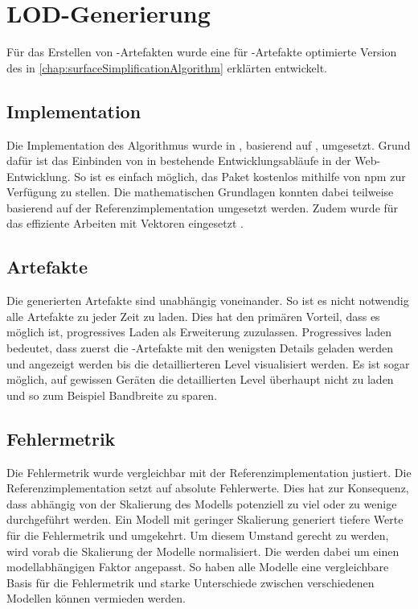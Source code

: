 \section{LOD-Generierung}

Für das Erstellen von -Artefakten wurde eine für -Artefakte optimierte Version des in \autoref{chap:surfaceSimplificationAlgorithm} erklärten  entwickelt.

\subsection{Implementation}

Die Implementation des Algorithmus wurde in , basierend auf , umgesetzt. Grund dafür ist das Einbinden von  in bestehende Entwicklungsabläufe in der Web-Entwicklung. So ist es einfach möglich, das Paket kostenlos mithilfe von \gls{npm} zur Verfügung zu stellen.
Die mathematischen Grundlagen konnten dabei teilweise basierend auf der Referenzimplementation umgesetzt werden. Zudem wurde  für das effiziente Arbeiten mit Vektoren eingesetzt \cite{glMatrix}.

\subsection{Artefakte}

Die generierten Artefakte sind unabhängig voneinander. So ist es nicht notwendig alle Artefakte zu jeder Zeit zu laden. Dies hat den primären Vorteil, dass es möglich ist, progressives Laden als Erweiterung zuzulassen. Progressives laden bedeutet, dass zuerst die -Artefakte mit den wenigsten Details geladen werden und angezeigt werden bis die detaillierteren Level visualisiert werden.
Es ist sogar möglich, auf gewissen Geräten die detaillierten Level überhaupt nicht zu laden und so zum Beispiel Bandbreite zu sparen.

\subsection{Fehlermetrik}

Die Fehlermetrik wurde vergleichbar mit der Referenzimplementation justiert. Die Referenzimplementation setzt auf absolute Fehlerwerte. Dies hat zur Konsequenz, dass abhängig von der Skalierung des Modells potenziell zu viel oder zu wenige  durchgeführt werden. Ein Modell mit geringer Skalierung generiert tiefere Werte für die Fehlermetrik und umgekehrt. Um diesem Umstand gerecht zu werden, wird vorab die Skalierung der Modelle normalisiert. Die  werden dabei um einen modellabhängigen Faktor angepasst. So haben alle Modelle eine vergleichbare Basis für die Fehlermetrik und starke Unterschiede zwischen verschiedenen Modellen können vermieden werden.

